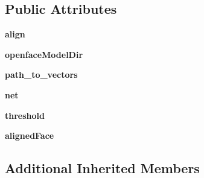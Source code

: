 \subsection*{Public Attributes}
\begin{DoxyCompactItemize}
\item 
\hypertarget{classRecognitionFactory_1_1OpenFace_a1c901bdf709de3d7e1b40093af926974}{{\bfseries align}}\label{classRecognitionFactory_1_1OpenFace_a1c901bdf709de3d7e1b40093af926974}

\item 
\hypertarget{classRecognitionFactory_1_1OpenFace_a1ee73330a23fce8a6ca41231d778ec91}{{\bfseries openface\-Model\-Dir}}\label{classRecognitionFactory_1_1OpenFace_a1ee73330a23fce8a6ca41231d778ec91}

\item 
\hypertarget{classRecognitionFactory_1_1OpenFace_a39ce348db003f167e9f2812a7f2fbd4b}{{\bfseries path\-\_\-to\-\_\-vectors}}\label{classRecognitionFactory_1_1OpenFace_a39ce348db003f167e9f2812a7f2fbd4b}

\item 
\hypertarget{classRecognitionFactory_1_1OpenFace_a4cd893ba8a2c3882481901c1093c3ae3}{{\bfseries net}}\label{classRecognitionFactory_1_1OpenFace_a4cd893ba8a2c3882481901c1093c3ae3}

\item 
\hypertarget{classRecognitionFactory_1_1OpenFace_a334cc50444b6906a8c08ec658c8f5438}{{\bfseries threshold}}\label{classRecognitionFactory_1_1OpenFace_a334cc50444b6906a8c08ec658c8f5438}

\item 
\hypertarget{classRecognitionFactory_1_1OpenFace_a1acaa386b19695644e18eab416f390ee}{{\bfseries aligned\-Face}}\label{classRecognitionFactory_1_1OpenFace_a1acaa386b19695644e18eab416f390ee}

\end{DoxyCompactItemize}
\subsection*{Additional Inherited Members}



